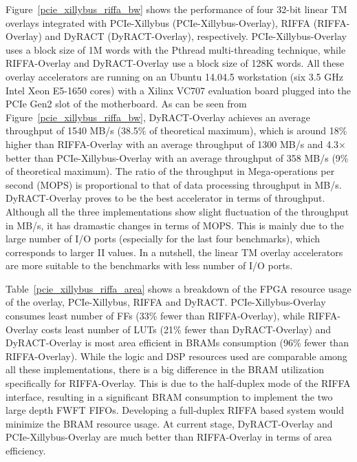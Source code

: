 Figure~\ref{pcie_xillybus_riffa_bw} shows the performance of four 32-bit linear TM overlays integrated with PCIe-Xillybus (PCIe-Xillybus-Overlay), RIFFA (RIFFA-Overlay) and DyRACT (DyRACT-Overlay), respectively. 
PCIe-Xillybus-Overlay uses a block size of 1M words with the Pthread multi-threading technique, while RIFFA-Overlay and DyRACT-Overlay use a block size of 128K words. 
All these overlay accelerators are running on an Ubuntu 14.04.5 workstation (six 3.5 GHz Intel Xeon E5-1650 cores) with a Xilinx VC707 evaluation board plugged into the PCIe Gen2 slot of the motherboard. 
As can be seen from Figure~\ref{pcie_xillybus_riffa_bw}, DyRACT-Overlay achieves an average throughput of 1540 MB/s (38.5\% of theoretical maximum), which is around 18\% higher than RIFFA-Overlay with an average throughput of 1300 MB/s and 4.3$\times$ better than PCIe-Xillybus-Overlay with an average throughput of 358 MB/s (9\% of theoretical maximum). 
The ratio of the throughput in Mega-operations per second (MOPS) is proportional to that of data processing throughput in MB/s. 
DyRACT-Overlay proves to be the best accelerator in terms of throughput. 
Although all the three implementations show slight fluctuation of the throughput in MB/s, it has dramastic changes in terms of MOPS. 
This is mainly due to the large number of I/O ports (especially for the last four benchmarks), which corresponds to larger II values. 
In a nutshell, the linear TM overlay accelerators are more suitable to the benchmarks with less number of I/O ports. 



Table~\ref{pcie_xillybus_riffa_area} shows a breakdown of the FPGA resource usage of the overlay, PCIe-Xillybus, RIFFA and DyRACT. 
PCIe-Xillybus-Overlay consumes least number of FFs (33\% fewer than RIFFA-Overlay), while RIFFA-Overlay costs least number of LUTs (21\% fewer than DyRACT-Overlay) and DyRACT-Overlay is most area efficient in BRAMs consumption (96\% fewer than RIFFA-Overlay). 
While the logic and DSP resources used are comparable among all these implementations, there is a big difference in the BRAM utilization specifically for RIFFA-Overlay.
This is due to the half-duplex mode of the RIFFA interface, resulting in a significant BRAM consumption to implement the two large depth FWFT FIFOs. 
Developing a full-duplex RIFFA based system would minimize the BRAM resource usage. 
At current stage, DyRACT-Overlay and PCIe-Xillybus-Overlay are much better than RIFFA-Overlay in terms of area efficiency. 


